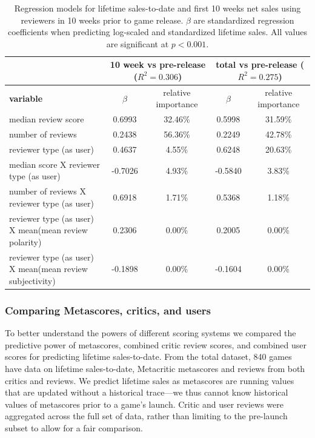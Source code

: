 \documentclass[letterpaper]{article}
\begin{document}
\begin{table}[tb]
\centering
\scriptsize
\begin{tabular}{|l|c|c|c|c|}
\hline & \multicolumn{2}{|c|}{\textbf{10 week vs pre-release} ($R^2 = 0.306$)} & \multicolumn{2}{|c|}{\textbf{total vs pre-release} ($R^2 = 0.275$)}\\ 
\hline \textbf{variable} & \textbf{$\beta$} & relative importance & \textbf{$\beta$} & relative importance\\ 
\hline median review score & 0.6993 & 32.46\% & 0.5998 & 31.59\%\\ 
\hline number of reviews & 0.2438 & 56.36\% & 0.2249 & 42.78\%\\ 
\hline reviewer type (as user) & 0.4637 & 4.55\% & 0.6248 & 20.63\%\\ 
\hline median score X reviewer type (as user) & -0.7026 & 4.93\% & -0.5840 & 3.83\%\\ 
\hline number of reviews X reviewer type (as user) & 0.6918 & 1.71\% & 0.5368 & 1.18\%\\ 
\hline reviewer type (as user) X mean(mean review polarity) & 0.2306 & 0.00\% & 0.2005 & 0.00\%\\ 
\hline reviewer type (as user) X mean(mean review subjectivity) & -0.1898 & 0.00\% & -0.1604 & 0.00\%\\ 
\hline 
\end{tabular}
\label{tab:sales_prerelease_lm}
\caption{Regression models for lifetime sales-to-date and first 10 weeks net sales using reviewers in 10 weeks prior to game release. $\beta$ are standardized regression coefficients when predicting log-scaled and standardized lifetime sales. All values are significant at $p < 0.001$.}
\end{table}

\subsubsection{Comparing Metascores, critics, and users}
To better understand the powers of different scoring systems we compared the predictive power of metascores, combined critic review scores, and combined user scores for predicting lifetime sales-to-date. From the total dataset, 840 games have data on lifetime sales-to-date, Metacritic metascores and reviews from both critics and reviews. We predict lifetime sales as metascores are running values that are updated without a historical trace---we thus cannot know historical values of metascores prior to a game's launch. Critic and user reviews were aggregated across the full set of data, rather than limiting to the pre-launch subset to allow for a fair comparison.
\end{document}
